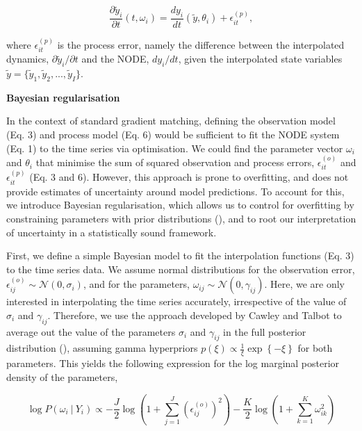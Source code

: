 \documentclass[11pt, oneside]{article}
\begin{document}
\vspace{-0.5cm}
\begin{equation}
    \frac{\partial \tilde{y}_i}{\partial t} (t, \omega_i) = \frac{dy_i}{dt} \left( \tilde{y},\theta_i \right) + \epsilon^{(p)}_{it},
\end{equation}

where $\epsilon^{(p)}_{it}$ is the process error, namely the difference between the interpolated dynamics, $\partial \tilde{y}_i/\partial t$ and the NODE, $dy_i/dt$, given the interpolated state variables $\tilde{y} = \{\tilde{y}_1,\tilde{y}_2, ...,\tilde{y}_I\}$. 

\textbf{Bayesian regularisation}

In the context of standard gradient matching, defining the observation model (Eq. 3) and process model (Eq. 6) would be sufficient to fit the NODE system (Eq. 1) to the time series via optimisation.
We could find the parameter vector $\omega_i$ and $\theta_i$ that minimise the sum of squared observation and process errors, $\epsilon_{it}^{(o)}$ and $\epsilon_{it}^{(p)}$ (Eq. 3 and 6).
However, this approach is prone to overfitting, and does not provide estimates of uncertainty around model predictions. 
To account for this, we introduce Bayesian regularisation, which allows us to control for overfitting by constraining parameters with prior distributions (\cite{Cawley2007}), and to root our interpretation of uncertainty in a statistically sound framework.

First, we define a simple Bayesian model to fit the interpolation functions (Eq. 3) to the time series data.
We assume normal distributions for the observation error, $\epsilon^{(o)}_{ij} \sim \mathcal{N}(0,\sigma_i)$, and for the parameters, $\omega_{ij} \sim \mathcal{N}(0,\gamma_{ij})$.
Here, we are only interested in interpolating the time series accurately, irrespective of the value of $\sigma_i$ and $\gamma_{ij}$.
Therefore, we use the approach developed by Cawley and Talbot to average out the value of the parameters $\sigma_i$ and $\gamma_{ij}$ in the full posterior distribution (\cite{Cawley2007}), assuming gamma hyperpriors $p(\xi) \propto \frac{1}{\xi} \exp\left\{- \xi \right\}$ for both parameters.
This yields the following expression for the log marginal posterior density of the parameters,

\vspace{-0.5cm}
\begin{equation}
    \log P(\omega_i ~|~ Y_i) \propto - \frac{J}{2} \log \left(1 + \sum_{j=1}^{J} \left( \epsilon^{(o)}_{ij} \right)^2 \right) - \frac{K}{2} \log \left(1 + \sum_{k=1}^{K} \omega_{ik}^2 \right)
\end{equation}
\end{document}

